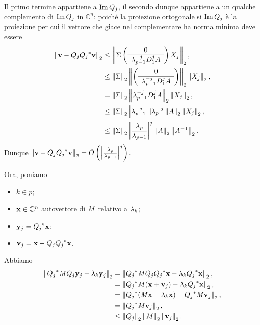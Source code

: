 Il primo termine appartiene a $\operatorname{Im}{Q_j}$, il secondo dunque appartiene a un qualche
complemento di $\operatorname{Im}{Q_j}$ in $\mathbb{C}^{n}$: poich\'e la proiezione ortogonale
si $\operatorname{Im}{Q_j}$ \`e la proiezione per cui il vettore che giace nel complementare ha
norma minima deve essere
\begin{align*}
  \Norm{\Vector - Q_j\HermitianTransposed{Q_j} \Vector}[2]
  &\leq \Norm{\SpectralBaseChange
    \lmatrix
    \begin{array}{c}
      0\\
      \hline
      \Eigenvalue_{p - 1}^{-j} \DiagonalMatrix_1^j A
    \end{array}
    \rmatrix
    X_j}[2],\\
  &\leq \Norm{\SpectralBaseChange}[2]
    \Norm{\lmatrix
    \begin{array}{c}
      0\\
      \hline
      \Eigenvalue_{p - 1}^{-j} \DiagonalMatrix_1^j A
    \end{array}
    \rmatrix}[2]
    \Norm{X_j}[2],\\
  &= \Norm{\SpectralBaseChange}[2]
    \Norm{\Eigenvalue_{p - 1}^{-j} \DiagonalMatrix_1^j A}[2]
    \Norm{X_j}[2],\\
  &\leq \Norm{\SpectralBaseChange}[2]
    \AbsoluteValue{\Eigenvalue_{p - 1}^{-j}} \AbsoluteValue{\Eigenvalue_p}^j
    \Norm{A}[2]
    \Norm{X_j}[2],\\
  &\leq \Norm{\SpectralBaseChange}[2]
    \AbsoluteValue{\frac{\Eigenvalue_p}{\Eigenvalue_{p - 1}}}^j
    \Norm{A}[2]
    \Norm{A^{-1}}[2].
\end{align*}
Dunque
$\Norm{\Vector - Q_j\HermitianTransposed{Q_j} \Vector}[2]
= \BigO{\AbsoluteValue{\frac{\Eigenvalue_p}{\Eigenvalue_{p - 1}}}^j}$.
\par Ora, poniamo
\begin{itemize}
  \item $k \in p$;
  \item $\Eigenvector \in \mathbb{C}^n$ autovettore di $\mathit{M}$ relativo a $\lambda_k$;
  \item $\VarEigenvector_j = \HermitianTransposed{Q_j} \Eigenvector$;
  \item $\Vector_j = \Eigenvector
          - Q_j\HermitianTransposed{Q_j} \Eigenvector$.
\end{itemize}
Abbiamo
\begin{align*}
  \Norm{
    \HermitianTransposed{Q_j} \Matrix Q_j \VarEigenvector_j
    - \Eigenvalue_k \VarEigenvector_j
    }[2]
  &= \Norm{
    \HermitianTransposed{Q_j} \Matrix Q_j
    \HermitianTransposed{Q_j} \Eigenvector
    - \Eigenvalue_k \HermitianTransposed{Q_j} \Eigenvector
    }[2],\\
  &= \Norm{
    \HermitianTransposed{Q_j} \Matrix (\Eigenvector + \Vector_j)
    - \Eigenvalue_k \HermitianTransposed{Q_j} \Eigenvector
    }[2],\\
  &= \Norm{
    \HermitianTransposed{Q_j} (\Matrix \Eigenvector
    - \Eigenvalue_k \Eigenvector)
    + \HermitianTransposed{Q_j} \Matrix \Vector_j
    }[2],\\
  &= \Norm{\HermitianTransposed{Q_j} \Matrix \Vector_j}[2],\\
  &\leq \Norm{Q_j}[2]
   \Norm{\Matrix}[2]
   \Norm{\Vector_j}[2].
\end{align*}
